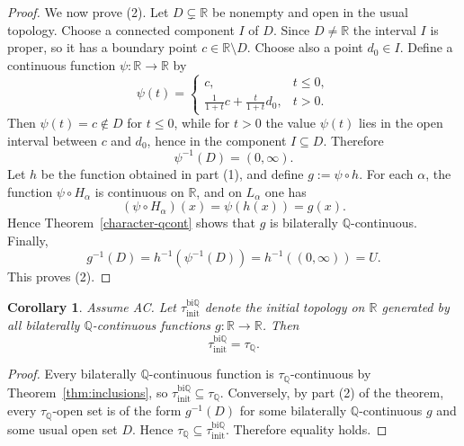 \documentclass[11pt]{amsart} %
\newtheorem{corollary}[theorem]{Corollary}
\theoremstyle{definition}
\newcommand{\Q}{\mathbb{Q}}
\begin{document}
\begin{proof}
We now prove (2). Let $D\subsetneq\mathbb{R}$ be nonempty and open in the usual topology. Choose a connected component $I$ of $D$. Since $D\ne\mathbb{R}$ the interval $I$ is proper, so it has a boundary point $c\in\mathbb{R}\setminus D$. Choose also a point $d_{0}\in I$. Define a continuous function $\psi:\mathbb{R}\rightarrow\mathbb{R}$ by
\[ \psi(t) = \begin{cases} c, & t\le0, \\ \frac{1}{1+t}c+\frac{t}{1+t}d_{0}, & t>0. \end{cases} \]
Then $\psi(t)=c\notin D$ for $t\le0$, while for $t>0$ the value $\psi(t)$ lies in the open interval between $c$ and $d_{0}$, hence in the component $I\subseteq D$. Therefore
\[ \psi^{-1}(D)=(0,\infty). \]
Let $h$ be the function obtained in part (1), and define $g:=\psi\circ h$. For each $\alpha$, the function $\psi\circ H_{\alpha}$ is continuous on $\mathbb{R}$, and on $L_{\alpha}$ one has
\begin{equation} 
(\psi\circ H_{\alpha})(x)=\psi(h(x))=g(x). \end{equation} 
Hence Theorem~\ref{character-qcont} shows that $g$ is bilaterally $\mathbb{Q}$-continuous. Finally,
\begin{equation} 
g^{-1}(D)=h^{-1}(\psi^{-1}(D))=h^{-1}((0,\infty))=U. \end{equation} 
This proves (2).
\end{proof}

\begin{corollary}
\label{cor:5.14}
Assume AC. 
Let $\tau_{\mathrm{init}}^{\mathrm{bi}\mathbb{Q}}$ denote the initial topology on $\mathbb{R}$ generated by all bilaterally $\mathbb{Q}$-continuous functions $g:\mathbb{R}\rightarrow\mathbb{R}$. Then
\begin{equation} 
\tau_{\mathrm{init}}^{\mathrm{bi}\mathbb{Q}}=\tau_{\Q}. \end{equation} 
\end{corollary}
\begin{proof}
Every bilaterally $\mathbb{Q}$-continuous function is $\tau_{\Q}$-continuous by Theorem~\ref{thm:inclusions}, so $\tau_{\mathrm{init}}^{\mathrm{bi}\mathbb{Q}}\subseteq\tau_{\Q}.$ 
Conversely, by part (2) of the theorem, every $\tau_{\Q}$-open set is of the form $g^{-1}(D)$ for some bilaterally $\mathbb{Q}$-continuous $g$ and some usual open set $D$. Hence
$\tau_{\Q}\subseteq \tau_{\mathrm{init}}^{\mathrm{bi}\mathbb{Q}}.$ 
Therefore equality holds.
\end{proof}
\end{document}
